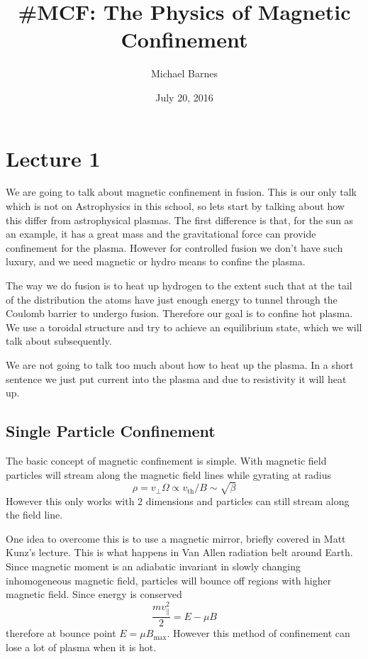 \documentclass[letterpaper, 11pt]{article}
\numberwithin{equation}{section}
\numberwithin{figure}{section}
\begin{document}
\title{\#MCF: The Physics of Magnetic Confinement}
\author{Michael Barnes}
\date{July 20, 2016}

\maketitle

\section{Lecture 1}

We are going to talk about magnetic confinement in fusion. This is our only talk
which is not on Astrophysics in this school, so lets start by talking about how
this differ from astrophysical plasmas. The first difference is that, for the
sun as an example, it has a great mass and the gravitational force can provide
confinement for the plasma. However for controlled fusion we don't have such
luxury, and we need magnetic or hydro means to confine the plasma.

The way we do fusion is to heat up hydrogen to the extent such that at the tail
of the distribution the atoms have just enough energy to tunnel through the Coulomb
barrier to undergo fusion. Therefore our goal is to confine hot plasma. We use a
toroidal structure and try to achieve an equilibrium state, which we will talk
about subsequently.

We are not going to talk too much about how to heat up the plasma. In a short
sentence we just put current into the plasma and due to resistivity it will heat
up.

\subsection{Single Particle Confinement}

The basic concept of magnetic confinement is simple. With magnetic field
particles will stream along the magnetic field lines while gyrating at radius
\begin{equation}
  \label{eq:1}
  \rho = v_{\perp}\Omega \propto v_\mathrm{th}/B \sim \sqrt{\beta}
\end{equation}
However this only works with 2 dimensions and particles can still stream along
the field line.

One idea to overcome this is to use a magnetic mirror, briefly covered in Matt
Kunz's lecture. This is what happens in Van Allen radiation belt around Earth.
Since magnetic moment is an adiabatic invariant in slowly changing inhomogeneous
magnetic field, particles will bounce off regions with higher magnetic field.
Since energy is conserved
\begin{equation}
  \label{eq:2}
  \frac{m v_{\parallel}^2}{2} = E - \mu B
\end{equation}
therefore at bounce point $E = \mu B_\mathrm{max}$. However this method of
confinement can lose a lot of plasma when it is hot.
\end{document}
